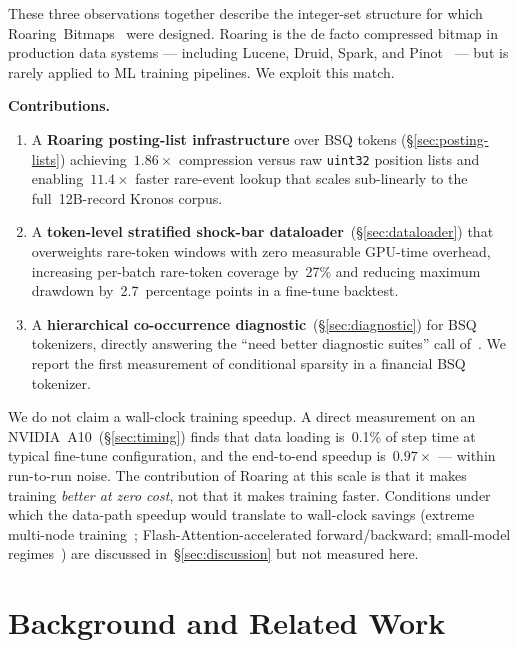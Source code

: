 \documentclass[10pt]{article}
\begin{document}
These three observations together describe the integer-set structure
for which Roaring~Bitmaps~\citep{roaring2016} were
designed. Roaring is the de facto compressed bitmap in production
data systems --- including Lucene, Druid, Spark, and
Pinot~\citep{druid} --- but is rarely applied to ML training
pipelines. We exploit this match.

\textbf{Contributions.}
\begin{enumerate}
\item A \textbf{Roaring posting-list infrastructure} over BSQ tokens
(\S\ref{sec:posting-lists}) achieving~$1.86\times$ compression versus
raw \texttt{uint32} position lists and enabling~$11.4\times$ faster
rare-event lookup that scales sub-linearly to the full~12B-record
Kronos corpus.
\item A \textbf{token-level stratified shock-bar
dataloader}~(\S\ref{sec:dataloader}) that overweights rare-token
windows with zero measurable GPU-time overhead, increasing per-batch
rare-token coverage by~27\% and reducing maximum drawdown
by~2.7~percentage points in a fine-tune backtest.
\item A \textbf{hierarchical co-occurrence
diagnostic}~(\S\ref{sec:diagnostic}) for BSQ tokenizers, directly
answering the ``need better diagnostic suites'' call
of~\citet{shrinks_codebook2026}. We report the first measurement of
conditional sparsity in a financial BSQ tokenizer.
\end{enumerate}

We do not claim a wall-clock training speedup. A direct measurement
on an NVIDIA~A10~(\S\ref{sec:timing}) finds that data loading
is~0.1\% of step time at typical fine-tune configuration, and the
end-to-end speedup is~$0.97\times$ --- within run-to-run
noise. The contribution of Roaring at this scale is that it makes
training \emph{better at zero cost}, not that it makes training
faster. Conditions under which the data-path speedup would translate
to wall-clock savings (extreme multi-node
training~\citep{megascale2024}; Flash-Attention-accelerated
forward/backward; small-model
regimes~\citep{computational_bottlenecks2024}) are discussed
in~\S\ref{sec:discussion} but not measured here.

\section{Background and Related Work}\label{sec:related}
\end{document}
